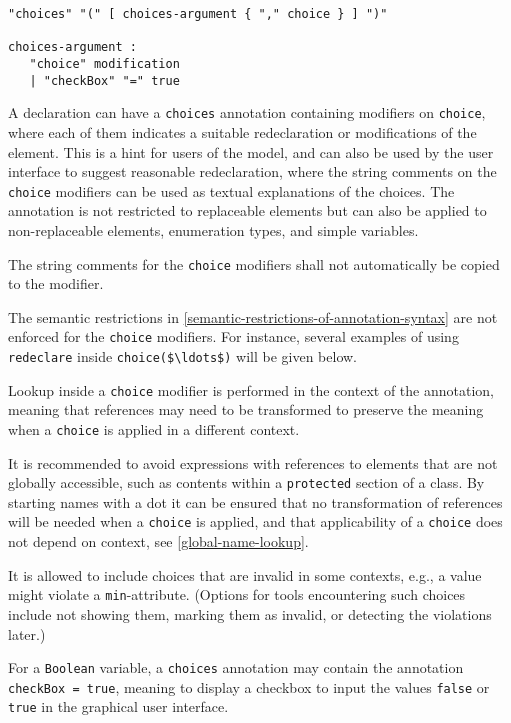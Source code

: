 \begin{annotationdefinition}[choices]
\begin{synopsis}[grammar]\begin{lstlisting}
"choices" "(" [ choices-argument { "," choice } ] ")"

choices-argument :
   "choice" modification
   | "checkBox" "=" true
\end{lstlisting}\end{synopsis}
\begin{semantics}
A declaration can have a \lstinline!choices! annotation containing modifiers on \lstinline!choice!, where each of them indicates a suitable redeclaration or modifications of the element.
This is a hint for users of the model, and can also be used by the user interface to suggest reasonable redeclaration, where the string comments on the \lstinline!choice! modifiers can be used as textual explanations of the choices.
The annotation is not restricted to replaceable elements but can also be applied to non-replaceable elements, enumeration types, and simple variables.

The string comments for the \lstinline!choice! modifiers shall not automatically be copied to the modifier.

The semantic restrictions in \cref{semantic-restrictions-of-annotation-syntax} are not enforced for the \lstinline!choice! modifiers.
For instance, several examples of using \lstinline!redeclare! inside \lstinline!choice($\ldots$)! will be given below.

Lookup inside a \lstinline!choice! modifier is performed in the context of the annotation, meaning that references may need to be transformed to preserve the meaning when a \lstinline!choice! is applied in a different context.

\begin{nonnormative}
It is recommended to avoid expressions with references to elements that are not globally accessible, such as contents within a \lstinline!protected! section of a class.
By starting names with a dot it can be ensured that no transformation of references will be needed when a \lstinline!choice! is applied, and that applicability of a \lstinline!choice! does not depend on context, see \cref{global-name-lookup}.
\end{nonnormative}

It is allowed to include choices that are invalid in some contexts, e.g., a value might violate a \lstinline!min!-attribute.
(Options for tools encountering such choices include not showing them, marking them as invalid, or detecting the violations later.)

For a \lstinline!Boolean! variable, a \lstinline!choices! annotation may contain the annotation \lstinline!checkBox = true!, meaning to display a checkbox to input the values \lstinline!false! or \lstinline!true! in the graphical user interface.
\end{semantics}
\end{annotationdefinition}

